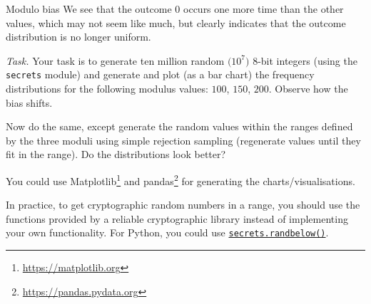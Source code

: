 \documentclass{practice}
\begin{document}
\begin{task}{Modulo bias}
  We see that the outcome $0$ occurs one more time than the other values, which may not seem like much, but clearly indicates that the outcome distribution is no longer uniform.

  \textit{Task.}
  Your task is to generate ten million random $\bigl(10^7\bigr)$ $8$-bit integers (using the \texttt{secrets} module) and generate and plot (as a bar chart) the frequency distributions for the following modulus values: $100$, $150$, $200$.
  Observe how the bias shifts.

  Now do the same, except generate the random values within the ranges defined by the three moduli using simple rejection sampling (regenerate values until they fit in the range).
  Do the distributions look better?

  You could use Matplotlib\footnote{\url{https://matplotlib.org}} and pandas\footnote{\url{https://pandas.pydata.org}} for generating the charts/visualisations.

  \begin{tcolorbox}[title=Good practice]
    In practice, to get cryptographic random numbers in a range, you should use the functions provided by a reliable cryptographic library instead of implementing your own functionality.
    \tcblower
    For Python, you could use 
    \href{https://docs.python.org/3/library/secrets.html#secrets.randbelow}{\texttt{secrets.randbelow()}}.
  \end{tcolorbox}
\end{task}
\end{document}
